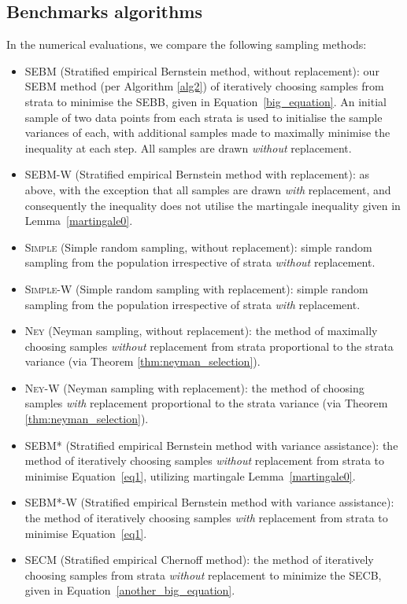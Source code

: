 \subsection{Benchmarks algorithms}
In the numerical evaluations, we compare the following sampling methods:
\begin{itemize}
\item 
\textsc{SEBM} (Stratified empirical Bernstein method, without replacement):
our SEBM method (per Algorithm \ref{alg2}) of iteratively choosing samples from strata to minimise the SEBB, given in Equation~\eqref{big_equation}. 
An initial sample of two data points from each strata is used to initialise the sample variances of each, with additional samples made to maximally minimise the inequality at each step. All samples are drawn \textit{without} replacement.
\item 
\textsc{SEBM-W} (Stratified empirical Bernstein method with replacement): 
as above, with the exception that all samples are drawn \textit{with} replacement, and consequently the inequality does not utilise the martingale inequality given in Lemma~\ref{martingale0}.
\item 
\textsc{Simple} (Simple random sampling, without replacement): simple random sampling from the population irrespective of strata \textit{without} replacement.
\item 
\textsc{Simple-W} (Simple random sampling with replacement): 
simple random sampling from the population irrespective of strata \textit{with} replacement.
\item \textsc{Ney} (Neyman sampling, without replacement): the method of maximally choosing samples \textit{without} replacement from strata proportional to the strata variance (via Theorem \ref{thm:neyman_selection}).
\item \textsc{Ney-W} (Neyman sampling with replacement): the method of choosing samples \textit{with} replacement proportional to the strata variance (via Theorem \ref{thm:neyman_selection}).
\item \textsc{SEBM*} (Stratified empirical Bernstein method with variance assistance): the method of iteratively choosing samples \textit{without} replacement from strata to minimise Equation~\eqref{eq1}, utilizing martingale Lemma~\ref{martingale0}.
\item \textsc{SEBM*-W} (Stratified empirical Bernstein method with variance assistance): the method of iteratively choosing samples \textit{with} replacement from strata to minimise Equation~\eqref{eq1}.
\item \textsc{SECM} (Stratified empirical Chernoff method): the method of iteratively choosing samples from strata \textit{without} replacement to minimize the SECB, given in Equation~\eqref{another_big_equation}. 

\end{itemize}
